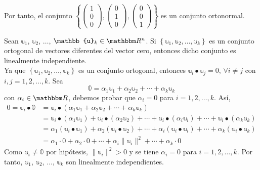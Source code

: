 \begin{example}
    Por tanto, el conjunto $\left\{ \begin{pmatrix} 1 \\ 0 \\ 0 \end{pmatrix}, \begin{pmatrix} 0 \\ 1 \\ 0 \end{pmatrix}, \begin{pmatrix} 0 \\ 0 \\ 1 \end{pmatrix} \right\}$ es un conjunto ortonormal.
\end{example}

\begin{theorem}\label{ortoindependiente}
    Sean $\mathbb{u}_1$, $\mathbb{u}_2$, $\dots$, $\mathbb{u}_k \in \RR[n]$. Si $\left\{ \mathbb{u}_1, \mathbb{u}_2, \dots, \mathbb{u}_k \right\}$ es un conjunto ortogonal de vectores diferentes del vector cero, entonces dicho conjunto es linealmente independiente. \\
    \demostracion Ya que $\left\{ \mathbb{u}_1, \mathbb{u}_2, \dots, \mathbb{u}_k \right\}$ es un conjunto ortogonal, entonces $\mathbb{u}_i \bullet \mathbb{u}_j = 0$, $\forall i \neq j$ con $i, j = 1, 2, \dots, k$. Sea
    $$\mathbb{0} = \alpha_1\mathbb{u}_1 + \alpha_2\mathbb{u}_2 + \cdots + \alpha_k\mathbb{u}_k$$
    con $\alpha_i \in \RR$, debemos probar que $\alpha_i = 0$ para $i = 1, 2, \dots, k$. Así,
    \begin{align*}
        0 = \mathbb{u}_i \bullet \mathbb{0} & = \mathbb{u}_i \bullet \left( \alpha_1\mathbb{u}_1 + \alpha_2\mathbb{u}_2 + \cdots + \alpha_k\mathbb{u}_k \right) \\
        & = \mathbb{u}_i \bullet ( \alpha_1\mathbb{u}_1) + \mathbb{u}_i \bullet (\alpha_2\mathbb{u}_2) + \cdots + \mathbb{u}_i \bullet (\alpha_i\mathbb{u}_i) + \cdots + \mathbb{u}_i \bullet (\alpha_k\mathbb{u}_k) \\
        & = \alpha_1 ( \mathbb{u}_i \bullet \mathbb{u}_1) + \alpha_2 (\mathbb{u}_i \bullet \mathbb{u}_2) + \cdots + \alpha_i (\mathbb{u}_i \bullet \mathbb{u}_i) + \cdots + \alpha_k (\mathbb{u}_i \bullet \mathbb{u}_k) \\
        & = \alpha_1 \cdot 0 + \alpha_2 \cdot 0 + \cdots + \alpha_i \| \mathbb{u}_i \|^2 + \cdots + \alpha_k \cdot 0
    \end{align*}
    Como $\mathbb{u}_i \neq \mathbb{0}$ por hipótesis, $\| \mathbb{u}_i \|^2 > 0$ y se tiene $\alpha_i = 0$ para $i = 1, 2, \dots, k$. Por tanto, $\mathbb{u}_1$, $\mathbb{u}_2$, $\dots$, $\mathbb{u}_k$ son linealmente independientes.
\end{theorem}

